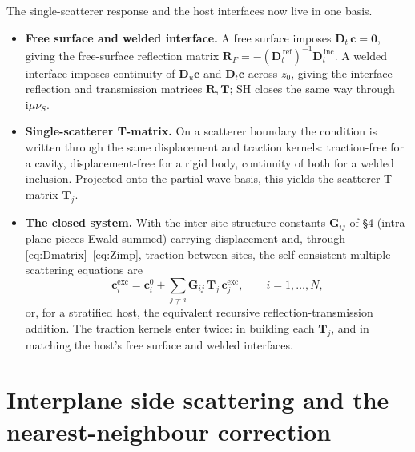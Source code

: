 \documentclass[11pt,a4paper]{article}
\newcommand{\ii}{\mathrm{i}}
\begin{document}
The single-scatterer response and the host interfaces now live in one basis.
\begin{itemize}
\item \textbf{Free surface and welded interface.} A free surface imposes
$\mathbf{D}_t\,\mathbf{c}=\mathbf{0}$, giving the free-surface reflection matrix
$\mathbf{R}_F=-(\mathbf{D}_t^{\,\mathrm{ref}})^{-1}\mathbf{D}_t^{\,\mathrm{inc}}$. A welded
interface imposes continuity of $\mathbf{D}_u\mathbf{c}$ and $\mathbf{D}_t\mathbf{c}$ across
$z_0$, giving the interface reflection and transmission matrices $\mathbf{R},\mathbf{T}$; SH
closes the same way through $\ii\mu\nu_S$.
\item \textbf{Single-scatterer T-matrix.} On a scatterer boundary the condition is written
through the same displacement and traction kernels: traction-free for a cavity,
displacement-free for a rigid body, continuity of both for a welded inclusion. Projected onto
the partial-wave basis, this yields the scatterer T-matrix $\mathbf{T}_j$.
\item \textbf{The closed system.} With the inter-site structure constants $\mathbf{G}_{ij}$ of
\S4 (intra-plane pieces Ewald-summed) carrying displacement and, through
\eqref{eq:Dmatrix}--\eqref{eq:Zimp}, traction between sites, the self-consistent
multiple-scattering equations are
\begin{equation}
\mathbf{c}_i^{\mathrm{exc}}=\mathbf{c}_i^{0}
+\sum_{j\ne i}\mathbf{G}_{ij}\,\mathbf{T}_j\,\mathbf{c}_j^{\mathrm{exc}},
\qquad i=1,\dots,N,
\end{equation}
or, for a stratified host, the equivalent recursive reflection-transmission addition. The
traction kernels enter twice: in building each $\mathbf{T}_j$, and in matching the host's free
surface and welded interfaces.
\end{itemize}

\section{Interplane side scattering and the nearest-neighbour correction}
\end{document}

